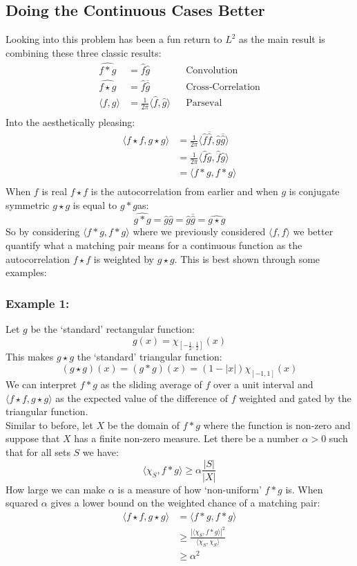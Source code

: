 \subsection{Doing the Continuous Cases Better}
Looking into this problem has been a fun return to $L^2$ as the main result is combining these three classic results:
\[\begin{aligned}
	\widehat{f*g} &= \hat{f}\hat{g} &&\text{Convolution}\\
	\widehat{f\star g} &= \hat{f}\overline{\hat{g}}&&\text{Cross-Correlation}\\
	\langle f,g\rangle &= \frac{1}{2\pi}\langle\hat{f},\hat{g}\rangle&&\text{Parseval}\\
\end{aligned}\]	
Into the aesthetically pleasing:
\[\begin{aligned}
	\langle f\star f,g\star g\rangle &=\frac{1}{2\pi}\langle \hat{f}\overline{\hat{f}},\hat{g}\overline{\hat{g}}\rangle\\
	&=\frac{1}{2\pi}\langle \hat{f}\hat{g},\hat{f}\hat{g}\rangle\\
	&=\langle f*g,f*g\rangle\\
\end{aligned}\]	
When $f$ is real $f\star f$ is the autocorrelation from earlier and when $g$ is conjugate symmetric $g\star g$ is equal to $g*g$as:
\[ \widehat{g*g} = \hat{g}\hat{g} = \hat{g}\overline{\hat{g}} = \widehat{g\star g} \]
So by considering $\langle f*g,f*g\rangle$ where we previously considered $\langle f,f\rangle$ we better quantify what a matching pair means for a continuous function as the autocorrelation $f\star f$ is weighted by $g\star g$.
This is best shown through some examples:

\subsubsection{Example 1:}
Let $g$ be the `standard' rectangular function:
\[g(x) = \chi_{\left[-\frac{1}{2},\frac{1}{2}\right]}(x)\]
This makes $g\star g$ the `standard' triangular function:
\[(g\star g)(x) = (g*g)(x) = (1-|x|)\chi_{\left[-1,1\right]}(x)\]
We can interpret $f*g$ as the sliding average of $f$ over a unit interval and $\langle f\star f,g\star g\rangle$ as the expected value of the difference of $f$ weighted and gated by the triangular function.
\\

Similar to before,
let $X$ be the domain of $f*g$ where the function is non-zero and suppose that $X$ has a finite non-zero measure.
Let there be a number $\alpha>0$ such that for all sets $S$ we have:
\[\langle \chi_S,f* g\rangle \geq \alpha\frac{|S|}{|X|}\]
How large we can make $\alpha$ is a measure of how `non-uniform' $f*g$ is.
When squared $\alpha$ gives a lower bound on the weighted chance of a matching pair:
\[\begin{aligned}
	\langle f\star f,g\star g\rangle &= \langle f*g,f*g\rangle\\
	&\geq \frac{|\langle \chi_S,f* g\rangle|^2}{\langle \chi_S,\chi_S\rangle}\\
	&\geq \alpha^2\\
\end{aligned}\]	

